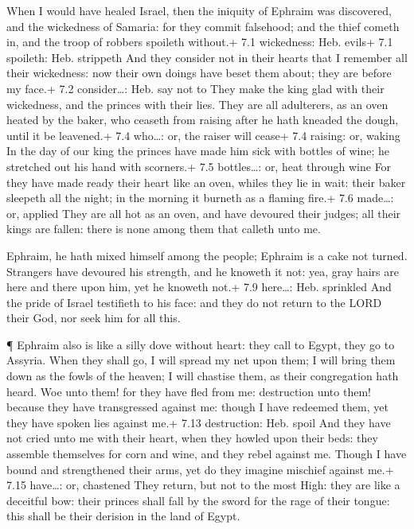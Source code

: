  When I would have healed Israel, then the iniquity of
Ephraim was discovered, and the wickedness of Samaria: for they commit
falsehood; and the thief cometh in, and the troop of robbers spoileth
without.+ 7.1 wickedness: Heb. evils+ 7.1 spoileth: Heb. strippeth
 And they consider not in their hearts that I remember all
their wickedness: now their own doings have beset them about; they are
before my face.+ 7.2 consider\ldots: Heb. say not to  They
make the king glad with their wickedness, and the princes with their
lies.  They are all adulterers, as an oven heated by the
baker, who ceaseth from raising after he hath kneaded the dough, until
it be leavened.+ 7.4 who\ldots: or, the raiser will cease+ 7.4 raising:
or, waking  In the day of our king the princes have made him
sick with bottles of wine; he stretched out his hand with scorners.+ 7.5
bottles\ldots: or, heat through wine  For they have made
ready their heart like an oven, whiles they lie in wait: their baker
sleepeth all the night; in the morning it burneth as a flaming fire.+
7.6 made\ldots: or, applied  They are all hot as an oven,
and have devoured their judges; all their kings are fallen: there is
none among them that calleth unto me.

 Ephraim, he hath mixed himself among the people; Ephraim is
a cake not turned.  Strangers have devoured his strength,
and he knoweth it not: yea, gray hairs are here and there upon him, yet
he knoweth not.+ 7.9 here\ldots: Heb. sprinkled  And the
pride of Israel testifieth to his face: and they do not return to the
LORD their God, nor seek him for all this.

 ¶ Ephraim also is like a silly dove without heart: they
call to Egypt, they go to Assyria.  When they shall go, I
will spread my net upon them; I will bring them down as the fowls of the
heaven; I will chastise them, as their congregation hath heard.
 Woe unto them! for they have fled from me: destruction
unto them! because they have transgressed against me: though I have
redeemed them, yet they have spoken lies against me.+ 7.13 destruction:
Heb. spoil  And they have not cried unto me with their
heart, when they howled upon their beds: they assemble themselves for
corn and wine, and they rebel against me.  Though I have
bound and strengthened their arms, yet do they imagine mischief against
me.+ 7.15 have\ldots: or, chastened  They return, but not
to the most High: they are like a deceitful bow: their princes shall
fall by the sword for the rage of their tongue: this shall be their
derision in the land of Egypt.


